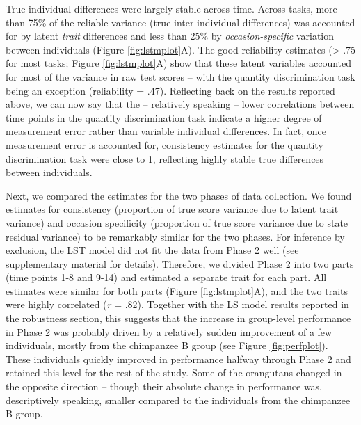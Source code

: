\documentclass[
  man,floatsintext]{apa6}
\begin{document}
True individual differences were largely stable across time. Across tasks, more than 75\% of the reliable variance (true inter-individual differences) was accounted for by latent \emph{trait} differences and less than 25\% by \emph{occasion-specific} variation between individuals (Figure \ref{fig:lstmplot}A). The good reliability estimates (\textgreater{} .75 for most tasks; Figure \ref{fig:lstmplot}A) show that these latent variables accounted for most of the variance in raw test scores -- with the quantity discrimination task being an exception (reliability = .47). Reflecting back on the results reported above, we can now say that the -- relatively speaking -- lower correlations between time points in the quantity discrimination task indicate a higher degree of measurement error rather than variable individual differences. In fact, once measurement error is accounted for, consistency estimates for the quantity discrimination task were close to 1, reflecting highly stable true differences between individuals.

Next, we compared the estimates for the two phases of data collection. We found estimates for consistency (proportion of true score variance due to latent trait variance) and occasion specificity (proportion of true score variance due to state residual variance) to be remarkably similar for the two phases. For inference by exclusion, the LST model did not fit the data from Phase 2 well (see supplementary material for details). Therefore, we divided Phase 2 into two parts (time points 1-8 and 9-14) and estimated a separate trait for each part. All estimates were similar for both parts (Figure \ref{fig:lstmplot}A), and the two traits were highly correlated (\emph{r} = .82). Together with the LS model results reported in the robustness section, this suggests that the increase in group-level performance in Phase 2 was probably driven by a relatively sudden improvement of a few individuals, mostly from the chimpanzee B group (see Figure \ref{fig:perfplot}). These individuals quickly improved in performance halfway through Phase 2 and retained this level for the rest of the study. Some of the orangutans changed in the opposite direction -- though their absolute change in performance was, descriptively speaking, smaller compared to the individuals from the chimpanzee B group.
\end{document}
